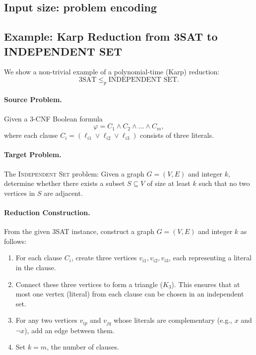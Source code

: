 \documentclass[9pt]{extarticle}
\begin{document}
\subsection{Input size: problem encoding}


\subsection{Example: Karp Reduction from 3SAT to INDEPENDENT SET}

We show a non-trivial example of a polynomial-time (Karp) reduction:
\[
3\text{SAT} \leq_p \text{INDEPENDENT SET}.
\]

\paragraph{Source Problem.} 
Given a 3-CNF Boolean formula 
\[
\varphi = C_1 \land C_2 \land \dots \land C_m,
\]
where each clause \( C_i = (\ell_{i1} \lor \ell_{i2} \lor \ell_{i3}) \) consists of three literals.

\paragraph{Target Problem.} 
The \textsc{Independent Set} problem: Given a graph \( G = (V, E) \) and integer \( k \), determine whether there exists a subset \( S \subseteq V \) of size at least \( k \) such that no two vertices in \( S \) are adjacent.

\paragraph{Reduction Construction.}
From the given 3SAT instance, construct a graph \( G = (V, E) \) and integer \( k \) as follows:
\begin{enumerate}
    \item For each clause \( C_i \), create three vertices \( v_{i1}, v_{i2}, v_{i3} \), each representing a literal in the clause.
    \item Connect these three vertices to form a triangle (\( K_3 \)). This ensures that at most one vertex (literal) from each clause can be chosen in an independent set.
    \item For any two vertices \( v_{ip} \) and \( v_{jq} \) whose literals are complementary (e.g., \( x \) and \( \neg x \)), add an edge between them.
    \item Set \( k = m \), the number of clauses.
\end{enumerate}
\end{document}
